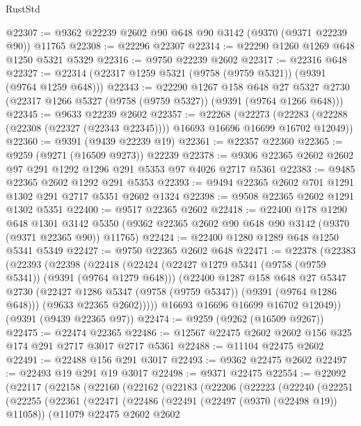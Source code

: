 \begin{lexlean}{RustStd}
\begin{coremodule}
@22307 := @9362 @22239 @2602 @90 @648 @90 @3142 (@9370 (@9371 @22239 @90)) @11765
@22308 := @22296 @22307
@22314 := @22290 @1260 @1269 @648 @1250 @5321 @5329
@22316 := @9750 @22239 @2602
@22317 := @22316 @648
@22327 := @22314 (@22317 @1259 @5321 (@9758 (@9759 @5321)) (@9391 (@9764 @1259 @648)))
@22343 := @22290
    @1267
    @158
    @648
    @27
    @5327
    @2730
    (@22317 @1266 @5327 (@9758 (@9759 @5327)) (@9391 (@9764 @1266 @648)))
@22345 := @9633 @22239 @2602
@22357 := @22268
    (@22273 (@22283 (@22288 (@22308 (@22327 (@22343 @22345)))) @16693 @16696 @16699 @16702 @12049))
@22360 := @9391 (@9439 @22239 @19)
@22361 := @22357 @22360
@22365 := @9259 (@9271 (@16509 @9273)) @22239
@22378 := @9306 @22365 @2602 @2602 @97 @291 @1292 @1296 @291 @5353 @97 @4026 @2717 @5361
@22383 := @9485 @22365 @2602 @1292 @291 @5353
@22393 := @9494 @22365 @2602 @701 @1291 @1302 @291 @2717 @5351 @2602 @1324
@22398 := @9508 @22365 @2602 @1291 @1302 @5351
@22400 := @9517 @22365 @2602
@22418 := @22400
    @178
    @1290
    @648
    @1301
    @3142
    @5350
    (@9362 @22365 @2602 @90 @648 @90 @3142 (@9370 (@9371 @22365 @90)) @11765)
@22424 := @22400 @1280 @1289 @648 @1250 @5341 @5349
@22427 := @9750 @22365 @2602 @648
@22471 := @22378
    (@22383
      (@22393
        (@22398
          (@22418
            (@22424
              (@22427 @1279 @5341 (@9758 (@9759 @5341)) (@9391 (@9764 @1279 @648)))
              (@22400
                @1287
                @158
                @648
                @27
                @5347
                @2730
                (@22427 @1286 @5347 (@9758 (@9759 @5347)) (@9391 (@9764 @1286 @648)))
                (@9633 @22365 @2602)))))
        @16693
        @16696
        @16699
        @16702
        @12049))
    (@9391 (@9439 @22365 @97))
@22474 := @9259 (@9262 (@16509 @9267))
@22475 := @22474 @22365
@22486 := @12567 @22475 @2602 @2602 @156 @325 @174 @291 @2717 @3017 @2717 @5361
@22488 := @11104 @22475 @2602
@22491 := @22488 @156 @291 @3017
@22493 := @9362 @22475 @2602
@22497 := @22493 @19 @291 @19 @3017
@22498 := @9371 @22475
@22554 := @22092
    (@22117
      (@22158
        (@22160
          (@22162
            (@22183
              (@22206
                (@22223
                  (@22240
                    (@22251
                      (@22255
                        (@22361
                          (@22471
                            (@22486
                              (@22491 (@22497 (@9370 (@22498 @19)) @11058))
                              (@11079
                                @22475
                                @2602
                                @2602

\end{coremodule}
\end{lexlean}
